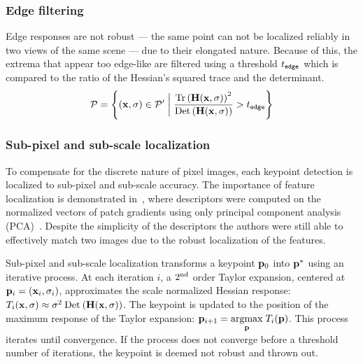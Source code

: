        \subsubsection{Edge filtering}
            Edge responses are not robust --- \ie{} the same point can not be localized reliably in two views of the
            same scene --- due to their elongated nature. Because of this, the extrema that appear too edge-like
            are filtered using a threshold $t_{\tt{edge}}$ which is compared to the ratio of the Hessian's squared
            trace and the determinant.
            \begin{equation}
                \mathcal{P} = \left\{(\mathbf{x}, \sigma) \in \mathcal{P}' \;\bigg|\; \frac{\mathbin{\textrm{Tr}}\left(\mathbf{H}(\mathbf{x}, \sigma)\right)^2}{\mathbin{\textrm{Det}}\left(\mathbf{H}(\mathbf{x}, \sigma)\right)} > t_{\tt{edge}}\right\}
            \end{equation}

        \subsubsection{Sub-pixel and sub-scale localization}
            To compensate for the discrete nature of pixel images, each keypoint detection is localized to
            sub-pixel and sub-scale accuracy. The importance of feature localization is demonstrated
            in~\cite{ke_pca_sift_2004}, where descriptors were computed on the normalized vectors of patch
            gradients using only principal component analysis (PCA)~\cite{jolliffe_principal_1986}. Despite the
            simplicity of the descriptors the authors were still able to effectively match two images due to the
            robust localization of the features.

            Sub-pixel and sub-scale localization transforms a keypoint $\mathbf{p}_0$ into $\mathbf{p}^*$ using an iterative
            process. At each iteration $i$, a $2^{\textrm{nd}}{}$ order Taylor expansion, centered at %
            $\mathbf{p}_i = (\mathbf{x}_i, \sigma_i)$, approximates the scale normalized Hessian response: %
            $T_i(\mathbf{x}, \sigma) \approx \sigma^2 \mathbin{\textrm{Det}}\left(\mathbf{H}(\mathbf{x}, \sigma)\right)$. The keypoint is updated to the position of the
            maximum response of the Taylor expansion: $\mathbf{p}_{i + 1} = \underset{\mathbf{p}}{\operatorname{argmax}}\; T_i(\mathbf{p})$. This process iterates
            until convergence. If the process does not converge before a threshold number of iterations, the
            keypoint is deemed not robust and thrown out.

